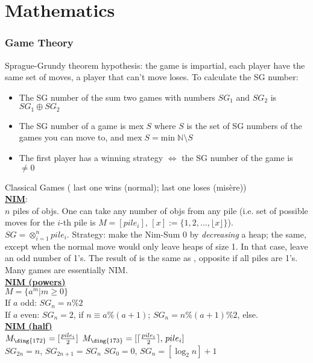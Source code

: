 
\chapter{Mathematics}

\subsection{Game Theory}

Sprague-Grundy theorem hypothesis: the game is impartial, each player have the same set of moves, a player that can't move loses.
To calculate the SG number:
\begin{itemize}
    \item The SG number of the sum two games with numbers $SG_1$ and $SG_2$ is $SG_1 \oplus SG_2$
    \item The SG number of a game is $\mathrm{mex} \; S$ where $S$ is the set of SG numbers of the games you can move to, and $\mathrm{mex} \; S = \mathrm{min} \; \mathbb{N} \setminus S$
    \item The first player has a winning strategy $\Leftrightarrow$ the SG number of the game is $\neq 0$
\end{itemize}
Classical Games ( last one wins (normal);  last one loses (mis\`ere))\\

\underline{\textbf{NIM}}: \\
$n$ piles of objs. One can take any number of objs from any pile (i.e. set of possible moves for the $i$-th pile is $M=[pile_i]$, $[x]:=\{1,2,...,\lfloor x \rfloor\}$).\\
$SG=\otimes_{i=1}^n pile_i$. Strategy:  make the Nim-Sum 0 by \emph{decreasing} a heap;  the same, except when the normal move would only leave heaps of size 1. In that case, leave an odd number of 1's.
The result of  is the same as , opposite if all piles are 1's. Many games are essentially NIM.\\
\underline{\textbf{NIM (powers)}}\\
$M = \{a^m|m\ge 0\}$\\
If $a$ odd: $SG_n = n \% 2$\\
If $a$ even: $SG_n = 2$, if $n\equiv a\%(a+1)$; $SG_n = n \% (a+1) \% 2$, else.\\
\underline{\textbf{NIM (half)}}\\
$M_{\text{\ding{172}}} = [\frac{pile_i}{2}]$ \newline $M_{\text{\ding{173}}} = [\lceil \frac{pile_i}{2} \rceil\text{, } pile_i]$\\
$SG_{2n} = n$, $SG_{2n+1}=SG_{n}$ \newline {}$SG_0=0$, $SG_n=[\log_2 n]+1$
\\ 


